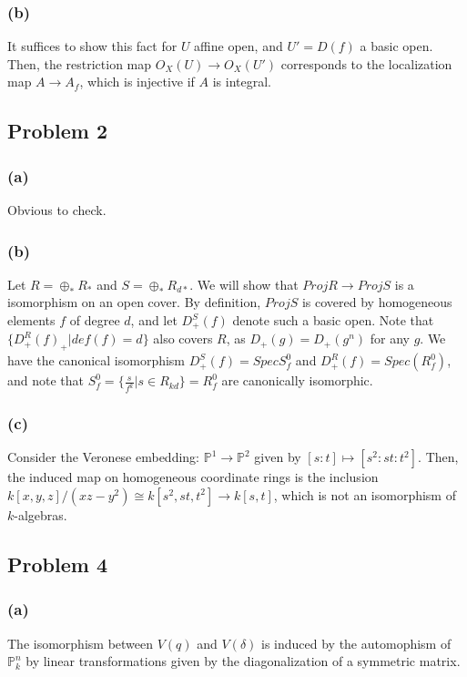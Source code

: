 \documentclass{article}
\theoremstyle{definition}
\theoremstyle{definition}
\theoremstyle{definition}
\theoremstyle{definition}
\theoremstyle{definition}
\theoremstyle{definition}
\theoremstyle{definition}
\begin{document}
\subsubsection*{(b)}
It suffices to show this fact for $U$ affine open, and $U'=D(f)$ a basic open. Then, the restriction map $O_X(U)\to O_X(U')$ corresponds to the localization map $A\to A_f$, which is injective if $A$ is integral.  

\subsection*{Problem 2}
\subsubsection*{(a)}
Obvious to check.

\subsubsection*{(b)}
Let $R=\oplus_{*}R_*$ and $S=\oplus_{*}R_{d*}$. We will show that $Proj R\to Proj S$ is a isomorphism on an open cover. By definition, $Proj S$ is covered by homogeneous elements $f$ of degree $d$, and let $D^S_+(f)$ denote such a basic open. Note that $\{D^R_+(f)_+|def(f)=d\}$ also covers $R$, as $D_+(g)=D_+(g^n)$ for any $g$. We have the canonical isomorphism $D^S_+(f)=Spec S_f^0$ and $D^R_+(f)=Spec(R_f^0)$, and note that $S_f^0=\{\frac{s}{f^k}|s\in R_{kd}\}=R_f^0$ are canonically isomorphic.

\subsubsection*{(c)}
Consider the Veronese embedding: $\mathbb{P}^1\to \mathbb{P}^2$ given by $[s:t]\mapsto [s^2:st:t^2]$. Then, the induced map on homogeneous coordinate rings is the inclusion $k[x,y,z]/(xz-y^2)\cong k[s^2,st,t^2]\to k[s,t]$, which is not an isomorphism of $k$-algebras. 




\subsection*{Problem 4}
\subsubsection*{(a)}
The isomorphism between $V(q)$ and $V(\delta)$ is induced by the automophism of $\mathbb{P}_k^n$ by linear transformations given by the diagonalization of a symmetric matrix. 
\end{document}

